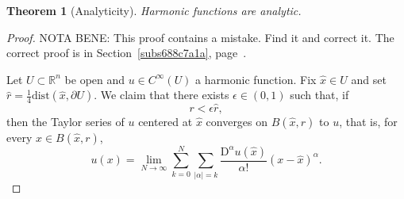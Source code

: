 \documentclass[a4paper,9pt]{amsart}
\newcommand{\R}{\mathbb{R}}	%
\newcommand{\de}{\partial}		%
\newcommand{\Diff}{\mathrm{D}}
\newcommand{\dist}{\mathrm{dist}}
\theoremstyle{plain}
\newtheorem{theorem}[proposition]{Theorem}
\theoremstyle{definition}
\theoremstyle{remark}
\begin{document}

\begin{theorem}[Analyticity]\label{thm67bb666b}
	Harmonic functions are analytic.
\end{theorem}
\begin{proof}
	NOTA BENE: This proof contains a mistake. 
	Find it and correct it. The correct proof is in Section~\ref{subs688c7a1a}, page~\pageref{subs688c7a1a}.

	Let $U\subset\R^n$ be open and $u\in C^\infty(U)$ a harmonic function.
	Fix $\hat x\in U$ and set $\hat r = \frac14 \dist(\hat x,\de U)$.
	We claim that there exists $\epsilon\in(0,1)$ such that, if
	\begin{equation}\label{eq67bb678e}
		r < %
		\epsilon \hat r,
	\end{equation}
	then the Taylor series of $u$ centered at $\hat x$ converges on $B(\hat x,r)$ to $u$,
	that is, for every $x\in B(\hat x,r)$,
	\begin{equation}\label{eq67bb6792}
		u(x) = \lim_{N\to\infty} \sum_{k=0}^N \sum_{|\alpha|=k} \frac{\Diff^\alpha u(\hat x)}{\alpha!} (x-\hat x)^\alpha .
	\end{equation}
	

\end{proof}
\end{document}
